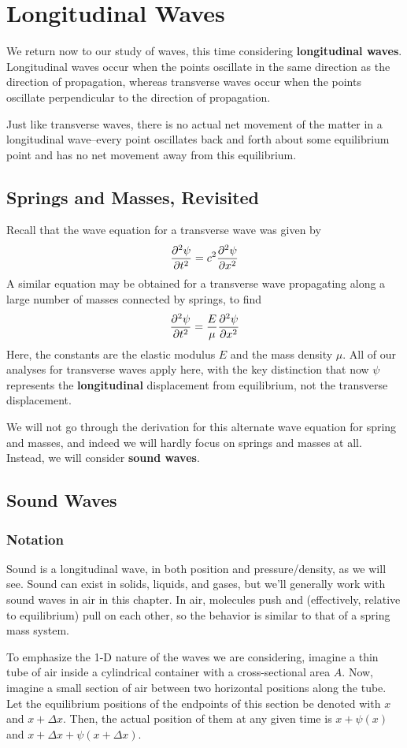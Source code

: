 \chapter{Longitudinal Waves}
We return now to our study of waves, this time considering \textbf{longitudinal waves}. Longitudinal waves occur when the points oscillate in the same direction as the direction of propagation, whereas transverse waves occur when the points oscillate perpendicular to the direction of propagation.

Just like transverse waves, there is no actual net movement of the matter in a longitudinal wave--every point oscillates back and forth about some equilibrium point and has no net movement away from this equilibrium.
\section{Springs and Masses, Revisited}
Recall that the wave equation for a transverse wave was given by
\[ \pdv[2]{\psi}{t} = c^2\pdv[2]{\psi}{x} \]
A similar equation may be obtained for a transverse wave propagating along a large number of masses connected by springs, to find
\[ \pdv[2]{\psi}{t} = \frac{E}{\mu}\pdv[2]{\psi}{x} \]
Here, the constants are the elastic modulus $E$ and the mass density $\mu$. All of our analyses for transverse waves apply here, with the key distinction that now $\psi$ represents the \textbf{longitudinal} displacement from equilibrium, not the transverse displacement. 

We will not go through the derivation for this alternate wave equation for spring and masses, and indeed we will hardly focus on springs and masses at all. Instead, we will consider \textbf{sound waves}.
\section{Sound Waves}
\subsection*{Notation}
Sound is a longitudinal wave, in both position and pressure/density, as we will see. Sound can exist in solids, liquids, and gases, but we'll generally work with sound waves in air in this chapter. In air, molecules push and (effectively, relative to equilibrium) pull on each other, so the behavior is similar to that of a spring mass system.

To emphasize the 1-D nature of the waves we are considering, imagine a thin tube of air inside a cylindrical container with a cross-sectional area $A$. Now, imagine a small section of air between two horizontal positions along the tube. Let the equilibrium positions of the endpoints of this section be denoted with $x$ and $x+\Delta x$. Then, the actual position of them at any given time is $x + \psi(x)$ and $x + \Delta x + \psi(x + \Delta x)$.

